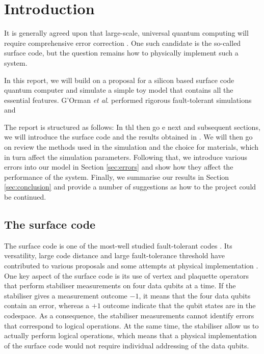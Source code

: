 
\section{Introduction} \label{sec:Introduction}

It is generally agreed upon that large-scale, universal quantum computing will require comprehensive error correction \cite{Wang2011,Fowler2012}. One such candidate is the so-called surface code, but the question remains how to physically implement such a system. 

In this report, we will build on a proposal for a silicon based surface code quantum computer \cite{the paper} and simulate a simple toy model that contains all the essential features. G'Orman \textit{et al}. performed rigorous fault-tolerant simulations and 




The report is structured as follows: In thl then go e next and subsequent sections, we will introduce the surface code and the results obtained in \cite{the paper}. We will then go on review the methods used in the simulation and the choice for materials, which in turn affect the simulation parameters. Following that, we introduce various errors into our model in Section \ref{sec:errors} and show how they affect the performance of the system. Finally, we summarise our results in Section \ref{sec:conclusion} and provide a number of suggestions as how to the project could be continued. 

\subsection{The surface code}
The surface code is one of the most-well studied fault-tolerant codes \cite{something}. Its versatility, large code distance and large fault-tolerance threshold have contributed to various proposals \cite{some review} and some attempts at physical implementation \cite{Martinis?}. One key aspect of the surface code is its use of vertex and plaquette operators that perform stabiliser measurements on four data qubits at a time. If the stabiliser gives a measurement outcome $-1$, it means that the four data qubits contain an error, whereas a $+1$ outcome indicate that the qubit states are in the codespace. As a consequence, the stabiliser measurements cannot identify errors that correspond to logical operations. At the same time, the stabiliser allow us to actually perform logical operations, which means that a physical implementation of the surface code would not require individual addressing of the data qubits. 

